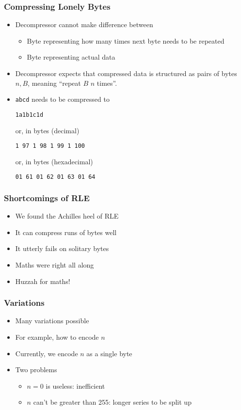 \begin{frame}
  \frametitle{Compressing Lonely Bytes}
  \begin{itemize}
    \item Decompressor cannot make difference between
          \begin{itemize}
            \item Byte representing how many times next byte needs to be repeated
            \item Byte representing actual data
          \end{itemize}
    \item Decompressor expects that compressed data
          is structured as pairs of bytes $n,B$, meaning
          ``repeat $B$ $n$ times''.
    \item \texttt{abcd} needs to be compressed to
          \begin{center}
            \tt 1a1b1c1d
          \end{center}
          or, in bytes (decimal)
          \begin{center}
            \tt 1 97 1 98 1 99 1 100
          \end{center}
          or, in bytes (hexadecimal)
          \begin{center}
            \tt 01 61 01 62 01 63 01 64
          \end{center}
  \end{itemize}
\end{frame}

\begin{frame}
  \frametitle{Shortcomings of RLE}
  \begin{itemize}
    \item We found the Achilles heel of RLE
    \item It can compress runs of bytes well
    \item It utterly fails on solitary bytes
    \item Maths were right all along
    \item Huzzah for maths!
  \end{itemize}
\end{frame}

\begin{frame}
  \frametitle{Variations}
  \begin{itemize}
    \item Many variations possible
    \item For example, how to encode $n$
    \item Currently, we encode $n$ as a single byte
    \item Two problems
          \begin{itemize}
            \item $n = 0$ is useless: inefficient
            \item $n$ can't be greater than 255: longer series to be split up
          \end{itemize}
  \end{itemize}
\end{frame}

